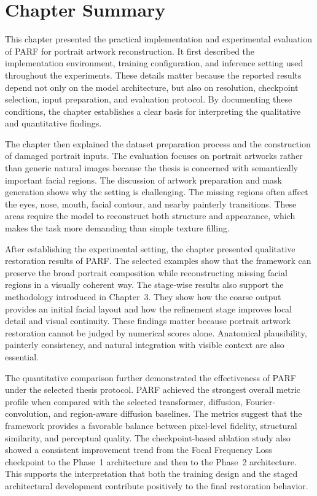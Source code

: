 \documentclass[12pt, twoside]{report}
\begin{document}
\section{Chapter Summary}

This chapter presented the practical implementation and experimental evaluation of PARF for portrait artwork reconstruction. It first described the implementation environment, training configuration, and inference setting used throughout the experiments. These details matter because the reported results depend not only on the model architecture, but also on resolution, checkpoint selection, input preparation, and evaluation protocol. By documenting these conditions, the chapter establishes a clear basis for interpreting the qualitative and quantitative findings.

The chapter then explained the dataset preparation process and the construction of damaged portrait inputs. The evaluation focuses on portrait artworks rather than generic natural images because the thesis is concerned with semantically important facial regions. The discussion of artwork preparation and mask generation shows why the setting is challenging. The missing regions often affect the eyes, nose, mouth, facial contour, and nearby painterly transitions. These areas require the model to reconstruct both structure and appearance, which makes the task more demanding than simple texture filling.

After establishing the experimental setting, the chapter presented qualitative restoration results of PARF. The selected examples show that the framework can preserve the broad portrait composition while reconstructing missing facial regions in a visually coherent way. The stage-wise results also support the methodology introduced in Chapter~3. They show how the coarse output provides an initial facial layout and how the refinement stage improves local detail and visual continuity. These findings matter because portrait artwork restoration cannot be judged by numerical scores alone. Anatomical plausibility, painterly consistency, and natural integration with visible context are also essential.

The quantitative comparison further demonstrated the effectiveness of PARF under the selected thesis protocol. PARF achieved the strongest overall metric profile when compared with the selected transformer, diffusion, Fourier-convolution, and region-aware diffusion baselines. The metrics suggest that the framework provides a favorable balance between pixel-level fidelity, structural similarity, and perceptual quality. The checkpoint-based ablation study also showed a consistent improvement trend from the Focal Frequency Loss checkpoint to the Phase~1 architecture and then to the Phase~2 architecture. This supports the interpretation that both the training design and the staged architectural development contribute positively to the final restoration behavior.
\end{document}
